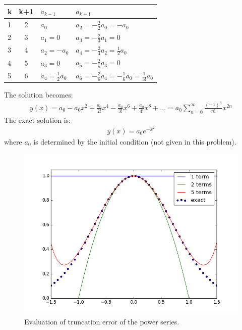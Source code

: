 \begin{exmp}{}
\begin{enumerate}
\begin{tabular}{ l c l l}
k &k+1& $a_{k-1}$     & $a_{k+1}$\\ \hline
1 & 2 & $a_0$         & $a_2 = -\frac{2}{2}a_0=-a_0$\\ 
2 & 3 & $a_1=0$       & $a_3=-\frac{2}{3} a_1=0$ \\
3 & 4 & $a_2=-a_0$    & $a_4=-\frac{2}{4} a_2=\frac{1}{2}a_0$ \\
4 & 5 & $a_3=0$       & $a_5=-\frac{2}{5} a_3=0$ \\
5 & 6 & $a_4 =\frac{1}{2}a_0$ & $a_6=-\frac{2}{6} a_4=-\frac{1}{6}a_0 =\frac{1}{3!}a_0 $ \\
\end{tabular}
The solution becomes:
\begin{align*}
y(x)=a_0-a_0x^2+\frac{a_0}{2!}x^4-\frac{a_0}{3!}x^6+\frac{a_0}{4!}x^8 +\hdots= a_0\sum^\infty_{n=0}\frac{(-1)^n}{n!}x^{2n}
\end{align*}
The exact solution is:
\begin{align*}
y(x)=a_0e^{-x^2}
\end{align*}
where $a_0$ is determined by the initial condition (not given in this problem).
\begin{figure}[h!]
\centering
\includegraphics[width=\textwidth]{figs/powerSeries.png}
\caption{Evaluation of truncation error of the power series.}
\end{figure}
\end{enumerate}
\end{exmp}

